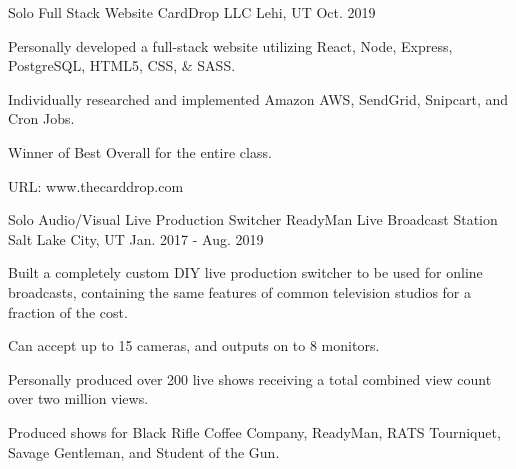 

\begin{cventries}

  \cventry
    {Solo Full Stack Website} %
    {CardDrop LLC} %
    {Lehi, UT} %
    {Oct. 2019} %
    {
      \begin{cvitems} %
        \item {Personally developed a full-stack website utilizing React, Node, Express, PostgreSQL, HTML5, CSS, \& SASS.}
        \item {Individually researched and implemented Amazon AWS, SendGrid, Snipcart, and Cron Jobs.}
        \item {Winner of Best Overall for the entire class.}
        \item {URL: www.thecarddrop.com}
      \end{cvitems}
    }

  \cventry
    {Solo Audio/Visual Live Production Switcher} %
    {ReadyMan Live Broadcast Station} %
    {Salt Lake City, UT} %
    {Jan. 2017 - Aug. 2019} %
    {
      \begin{cvitems} %
        \item {Built a completely custom DIY live production switcher to be used for online broadcasts, containing the same features of common television studios for a fraction of the cost.}
        \item {Can accept up to 15 cameras, and outputs on to 8 monitors.}
        \item {Personally produced over 200 live shows receiving a total combined view count over two million views.}
        \item {Produced shows for Black Rifle Coffee Company, ReadyMan, RATS Tourniquet, Savage Gentleman, and Student of the Gun.}
      \end{cvitems}
    }

\end{cventries}
